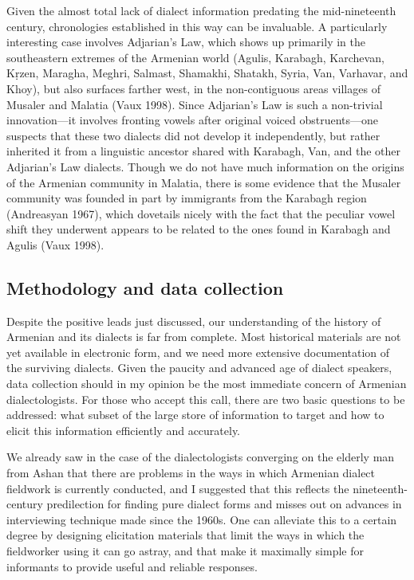 \begin{exe}
Given the almost total lack of dialect information predating the mid-nineteenth century, chronologies established in this way can be invaluable. A particularly interesting case involves Adjarian’s Law, which shows up primarily in the southeastern extremes of the Armenian world (Agulis, Karabagh, Karchevan, Kṛzen, Maragha, Meghri, Salmast, Shamakhi, Shatakh, Syria, Van, Varhavar, and Khoy), but also surfaces farther west, in the non-contiguous areas villages of Musaler and Malatia (Vaux 1998). Since Adjarian’s Law is such a non-trivial innovation—it involves fronting vowels after original voiced obstruents—one suspects that these two dialects did not develop it independently, but rather inherited it from a linguistic ancestor shared with Karabagh, Van, and the other Adjarian’s Law dialects. Though we do not have much information on the origins of the Armenian community in Malatia, there is some evidence that the Musaler community was founded in part by immigrants from the Karabagh region (Andreasyan 1967), which dovetails nicely with the fact that the peculiar vowel shift they underwent appears to be related to the ones found in Karabagh and Agulis (Vaux 1998).

\subsection{Methodology and data collection}

Despite the positive leads just discussed, our understanding of the history of Armenian and its dialects is far from complete. Most historical materials are not yet available in electronic form, and we need more extensive documentation of the surviving dialects. Given the paucity and advanced age of dialect speakers, data collection should in my opinion be the most immediate concern of Armenian dialectologists. For those who accept this call, there are two basic questions to be addressed: what subset of the large store of information to target and how to elicit this information efficiently and accurately. 

We already saw in the case of the dialectologists converging on the elderly man from Ashan that there are problems in the ways in which Armenian dialect fieldwork is currently conducted, and I suggested that this reflects the nineteenth-century predilection for finding pure dialect forms and misses out on advances in interviewing technique made since the 1960s. One can alleviate this to a certain degree by designing elicitation materials that limit the ways in which the fieldworker using it can go astray, and that make it maximally simple for informants to provide useful and reliable responses. 


\end{exe}
